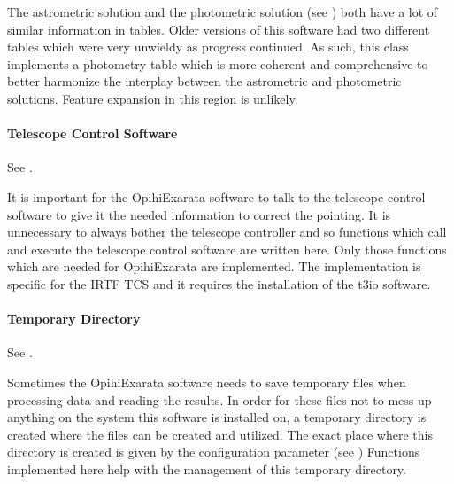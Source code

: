 \documentclass[letterpaper,11pt,english]{sphinxmanual}
\begin{document}
\sphinxAtStartPar
The astrometric solution and the photometric solution
(see {\hyperref[\detokenize{technical/architecture/vehicles_solutions:technical-architecture-vehicles-solutions}]{}}) both have a lot of
similar information in tables. Older versions of this software had two
different tables which were very unwieldy as progress continued. As such,
this class implements a photometry table which is more coherent and
comprehensive to better harmonize the interplay between the astrometric and
photometric solutions. Feature expansion in this region is unlikely.


\paragraph{Telescope Control Software}
\label{\detokenize{technical/architecture/library:telescope-control-software}}
\sphinxAtStartPar
See {\hyperref[\detokenize{code/opihiexarata.library.tcs:module-opihiexarata.library.tcs}]{}}.

\sphinxAtStartPar
It is important for the OpihiExarata software to talk to the telescope
control software to give it the needed information to correct the pointing. It
is unnecessary to always bother the telescope controller and so functions
which call and execute the telescope control software are written here. Only
those functions which are needed for OpihiExarata are implemented. The
implementation is specific for the IRTF TCS and it requires the installation
of the t3io software.


\paragraph{Temporary Directory}
\label{\detokenize{technical/architecture/library:temporary-directory}}
\sphinxAtStartPar
See {\hyperref[\detokenize{code/opihiexarata.library.temporary:module-opihiexarata.library.temporary}]{}}.

\sphinxAtStartPar
Sometimes the OpihiExarata software needs to save temporary files when
processing data and reading the results. In order for these files not to
mess up anything on the system this software is installed on, a temporary
directory is created where the files can be created and utilized. The exact
place where this directory is created is given by the configuration parameter
 (see {\hyperref[\detokenize{user/configuration:user-configuration}]{}}) Functions implemented
here help with the management of this temporary directory.
\end{document}

